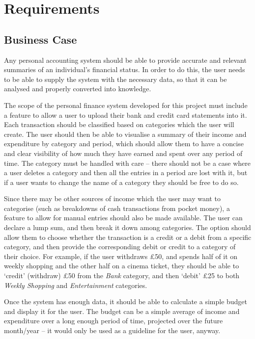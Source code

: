 \section{Requirements} \label{sec:Requirements}

\subsection{Business Case} \label{sec:Requirements.BusinessCase}
Any personal accounting system should be able to provide accurate and relevant
summaries of an individual's financial status. In order to do this, the user
needs to be able to supply the system with the necessary data, so that it can
be analysed and properly converted into knowledge.

The scope of the personal finance system developed for this project must
include a feature to allow a user to upload their bank and credit card
statements into it. Each transaction should be classified based on categories
which the user will create. The user should then be able to visualise a summary
of their income and expenditure by category and period, which should allow them
to have a concise and clear visibility of how much they have earned and spent
over any period of time. The category must be handled with care -- there should
not be a case where a user deletes a category and then all the entries in a
period are lost with it, but if a user wants to change the name of a category
they should be free to do so.

Since there may be other sources of income which the user may want to
categorise (such as breakdowns of cash transactions from pocket money), a
feature to allow for manual entries should also be made available. The user can
declare a lump sum, and then break it down among categories. The option should
allow them to choose whether the transaction is a credit or a debit from a
specific category, and then provide the corresponding debit or credit to a
category of their choice. For example, if the user withdraws \pounds50, and
spends half of it on weekly shopping and the other half on a cinema ticket,
they should be able to `credit' (withdraw) \pounds50 from the \emph{Bank}
category, and then `debit' \pounds25 to both \emph{Weekly Shopping} and
\emph{Entertainment} categories.

Once the system has enough data, it should be able to calculate a simple budget
and display it for the user. The budget can be a simple average of income and
expenditure over a long enough period of time, projected over the future
month/year -- it would only be used as a guideline for the user, anyway.

